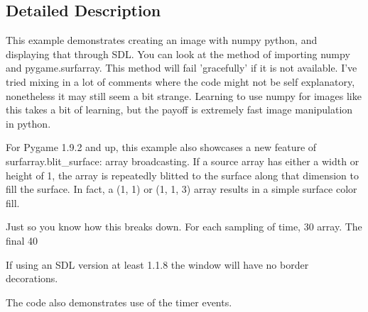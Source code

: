 \subsection{Detailed Description}
\begin{DoxyVerb}This example demonstrates creating an image with numpy
python, and displaying that through SDL. You can look at the
method of importing numpy and pygame.surfarray. This method
will fail 'gracefully' if it is not available.
I've tried mixing in a lot of comments where the code might
not be self explanatory, nonetheless it may still seem a bit
strange. Learning to use numpy for images like this takes a
bit of learning, but the payoff is extremely fast image
manipulation in python.

For Pygame 1.9.2 and up, this example also showcases a new feature
of surfarray.blit_surface: array broadcasting. If a source array
has either a width or height of 1, the array is repeatedly blitted
to the surface along that dimension to fill the surface. In fact,
a (1, 1) or (1, 1, 3) array results in a simple surface color fill.

Just so you know how this breaks down. For each sampling of
time, 30%
array. The final 40%

If using an SDL version at least 1.1.8 the window will have
no border decorations.

The code also demonstrates use of the timer events.\end{DoxyVerb}
 
